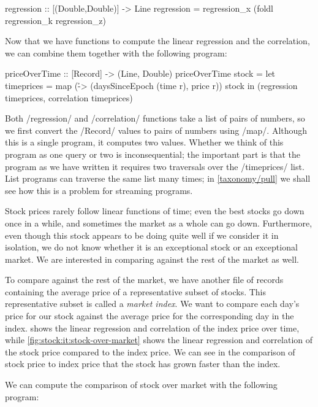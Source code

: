 \begin{haskell}
regression :: [(Double,Double)] -> Line
regression = regression_x (foldl regression_k regression_z)
\end{haskell}

Now that we have functions to compute the linear regression and the correlation, we can combine them together with the following program:

\begin{haskell}
priceOverTime :: [Record] -> (Line, Double)
priceOverTime stock =
  let timeprices = map (\r -> (daysSinceEpoch (time r), price r)) stock
  in (regression timeprices, correlation timeprices)
\end{haskell}

Both \Hs/regression/ and \Hs/correlation/ functions take a list of pairs of numbers, so we first convert the \Hs/Record/ values to pairs of numbers using \Hs/map/.
Although this is a single program, it computes two values.
Whether we think of this program as one query or two is inconsequential; the important part is that the program as we have written it requires two traversals over the \Hs/timeprices/ list.
List programs can traverse the same list many times; in \cref{taxonomy/pull} we shall see how this is a problem for streaming programs.

Stock prices rarely follow linear functions of time; even the best stocks go down once in a while, and sometimes the market as a whole can go down.
Furthermore, even though this stock appears to be doing quite well if we consider it in isolation, we do not know whether it is an exceptional stock or an exceptional market.
We are interested in comparing against the rest of the market as well.

To compare against the rest of the market, we have another file of records containing the average price of a representative subset of stocks.
This representative subset is called a \emph{market index}.
We want to compare each day's price for our stock against the average price for the corresponding day in the index.
 shows the linear regression and correlation of the index price over time, while \cref{fig:stock:it:stock-over-market} shows the linear regression and correlation of the stock price compared to the index price.
We can see in the comparison of stock price to index price that the stock has grown faster than the index.

We can compute the comparison of stock over market with the following program:

